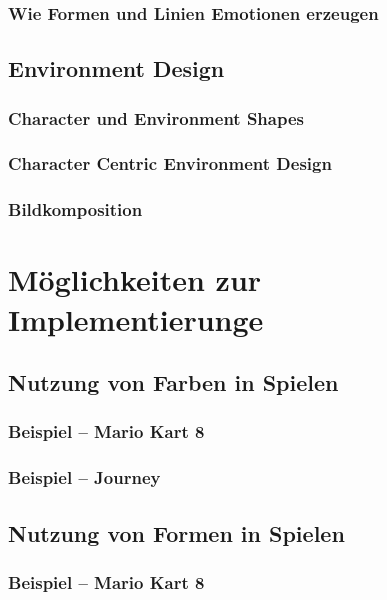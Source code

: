 \subsection{Wie Formen und Linien Emotionen erzeugen}



\section{Environment Design}

\subsection{Character und Environment Shapes}

\subsection{Character Centric Environment Design }

\subsection{Bildkomposition}


\chapter{Möglichkeiten zur Implementierunge}
\label{cha:sa_Einleitung}

\section{Nutzung von Farben in Spielen}

\subsection{Beispiel – Mario Kart 8}

\subsection{Beispiel – Journey}


\section{Nutzung von Formen in Spielen}

\subsection{Beispiel – Mario Kart 8}

